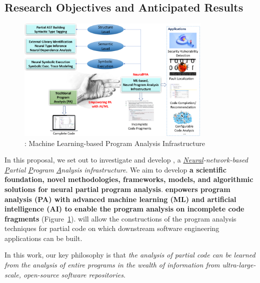 \subsection{Research Objectives and Anticipated Results}

\begin{figure}[t]
    \centering
    \includegraphics[width=0.83\textwidth]{graphs/neuralppa}
    \vspace{-12pt}
    \caption{{\tool}: Machine Learning-based Program Analysis Infrastructure}
    \label{fig:arch}
\end{figure}



%
In this proposal, we set out to investigate and develop {\tool}, a
{\em \underline{Neural}-network-based \underline{P}artial
  \underline{P}rogram \underline{A}nalysis infrastructure}. We aim to
develop {\bf a scientific foundation, novel methodologies, frameworks,
  models, and algorithmic solutions for neural partial program
  analysis}. {\tool} {\bf enpowers program analysis (PA) with advanced
machine learning (ML) and artificial intelligence (AI) to enable the
program analysis on incomplete code fragments} (Figure~\ref{fig:arch}).
{\tool} will allow the constructions of the program analysis
techniques for partial code on which downstream software
engineering applications can be built.


In this work, our key philosophy is that {\em the analysis of
  partial code can be learned from the analysis of entire programs in
  the wealth of information from ultra-large-scale, open-source
  software repositories}.



